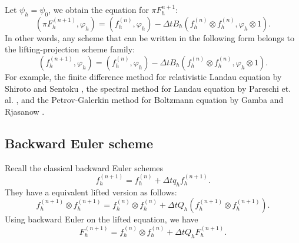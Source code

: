 \documentclass{article}
\newtheorem{remark}{Remark}
\numberwithin{equation}{section}
\begin{document}
Let $\psi_{h} = \psi_{0}$, we obtain the equation for $\pi F_{h}^{n+1}$:
\begin{equation*}
    \left(\pi F_{h}^{(n+1)}, \varphi_{h}\right) = \left(f_{h}^{(n)}, \varphi_{h}\right) - \Delta t B_{h}\left(f_{h}^{(n)}\otimes f_{h}^{(n)}, \varphi_{h}\otimes 1\right).
\end{equation*}
In other words, any scheme that can be written in the following form belongs to the lifting-projection scheme family:
\begin{equation*}
    \left(f_{h}^{(n+1)}, \varphi_{h}\right) = \left(f_{h}^{(n)}, \varphi_{h}\right) - \Delta t B_{h}\left(f_{h}^{(n)}\otimes f_{h}^{(n)}, \varphi_{h}\otimes 1\right).
\end{equation*}
For example, the finite difference method for relativistic Landau equation by Shiroto and Sentoku \cite{shiroto2019structure}, the spectral method for Landau equation by Pareschi et. al. \cite{pareschi2000fast}, and the Petrov-Galerkin method for Boltzmann equation by Gamba and Rjasanow \cite{gamba2018galerkin}.



\subsection{Backward Euler scheme}
Recall the classical backward Euler schemes
\begin{equation*}
    f^{(n+1)}_{h} = f^{(n)}_{h} + \Delta t q_{h} f_{h}^{(n+1)}.
\end{equation*}
They have a equivalent lifted version as follows:
\begin{equation*}
    f^{(n+1)}_{h} \otimes f^{(n+1)}_{h}= f^{(n)}_{h}\otimes f^{(n)}_{h} + \Delta t Q_{h} (f_{h}^{(n+1)}\otimes f_{h}^{(n+1)}).
\end{equation*}
Using backward Euler on the lifted equation, we have
    \begin{equation*}
        F^{(n+1)}_{h} = f^{(n)}_{h}\otimes f^{(n)}_{h} + \Delta t Q_{h} F_{h}^{(n+1)}.
    \end{equation*}
\end{document}
